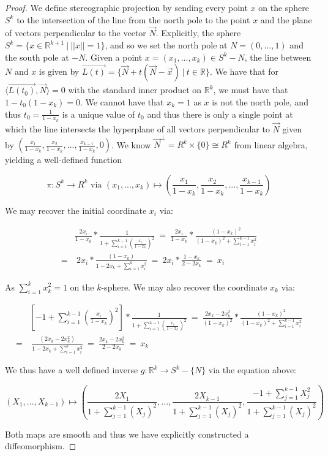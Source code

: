\documentclass{article}
\begin{document}
\begin{proof}
  We define stereographic projection by sending every point $x$ on the sphere $S^{k}$ to the intersection of the line from the north pole to the point $x$ and the plane of vectors perpendicular to the vector $\vec{N}$. Explicitly, the sphere $S^{k} = \{x \in \mathbb{R}^{k+1} \ | \ ||x|| = 1\}$, and so we set the north pole at $N = (0,...,1)$ and the south pole at $-N$. Given a point $x = (x_{1},...,x_{k}) \in S^{k} - N$, the line between $N$ and $x$ is given by $\overrightarrow{L(t)} = \{\vec{N} + t(\vec{N}-\vec{x}) \ | \ t \in \mathbb{R}\}$. We have that for $\langle \overrightarrow{L(t_{0})},\vec{N}\rangle = 0$ with the standard inner product on $\mathbb{R}^{k}$, we must have that $1 - t_{0}(1-x_{k}) = 0$. We cannot have that $x_{k} = 1$ as $x$ is not the north pole, and thus $t_{0}= \frac{1}{1-x_{k}}$ is a unique value of $t_{0}$ and thus there is only a single point at which the line intersects the hyperplane of all vectors perpendicular to $\vec{N}$ given by $(\frac{x_{1}}{1-x_{k}}, \frac{x_{2}}{1-x_{k}},..., \frac{x_{k-1}}{1-x_{k}},0)$. We know $\vec{N}^{\bot} = R^{k}\times\{0\} \cong R^{k}$ from linear algebra, yielding a well-defined function

  \[\pi: S^{k} \to R^{k} \text{ via } (x_{1},...,x_{k}) \mapsto \left(\frac{x_{1}}{1-x_{k}}, \frac{x_{2}}{1-x_{k}},..., \frac{x_{k-1}}{1-x_{k}} \right) \]

  We may recover the initial coordinate $x_{i}$ via:

  \begin{align*}
    &\frac{2x_{i}}{1-x_{k}} * \frac{1}{1+ \sum_{i=1}^{k-1}\left(\frac{x_{i}}{1-x_{k}}\right)^{2}} \  = \ \frac{2x_{i}}{1-x_{k}}*\frac{(1-x_{k})^{2}}{(1-x_{k})^{2}+ \sum_{i=1}^{k-1}x_{i}^{2}} \\
    = & \ 2x_{i}*\frac{(1-x_{k})}{1- 2x_{k} + \sum_{i=1}^{k}x_{i}^{2}} \ = \ 2x_{i}*\frac{1-x_{k}}{2-2x_{k}} \ = \ x_{i}
  \end{align*}
  
  As $\sum_{i=1}^{k}x_{k}^{2} = 1$ on the $k$-sphere. We may also recover the coordinate $x_{k}$ via:

  \begin{align*}
    &\left[-1 + \sum_{i=1}^{k-1}\left(\frac{x_{i}}{1-x_{k}}\right)^{2}\right] * \frac{1}{1+ \sum_{i=1}^{k-1}\left(\frac{x_{i}}{1-x_{k}}\right)^{2}} \  = \ \frac{2x_{k}-2x_{k}^{2}}{(1-x_{k})^{2}}*\frac{(1-x_{k})^{2}}{(1-x_{k})^{2}+ \sum_{i=1}^{k-1}x_{i}^{2}} \\
    = & \ \frac{(2x_{k}-2x_{k}^{2})}{1- 2x_{k} + \sum_{i=1}^{k}x_{i}^{2}} \ = \ \frac{2x_{k}-2x_{k}^{2}}{2-2x_{k}} \ = \ x_{k}
  \end{align*}
  
  We thus have a well defined inverse $g: \mathbb{R}^{k}\to S^{k}-\{N\}$ via the equation above:

  \[ (X_{1},...,X_{k-1}) \mapsto \left(\frac{2X_{1}}{1+\sum_{j=1}^{k-1}(X_{j})^{2}},...,\frac{2X_{k-1}}{1+\sum_{j=1}^{k-1}(X_{j})^{2}}, \frac{-1 + \sum_{j=1}^{k-1}X_{j}^{2}}{1+\sum_{j=1}^{k-1}(X_{j})^{2}}\right)
  \]

  Both maps are smooth and thus we have explicitly constructed a diffeomorphism.
  \end{proof}
  
\end{document}
